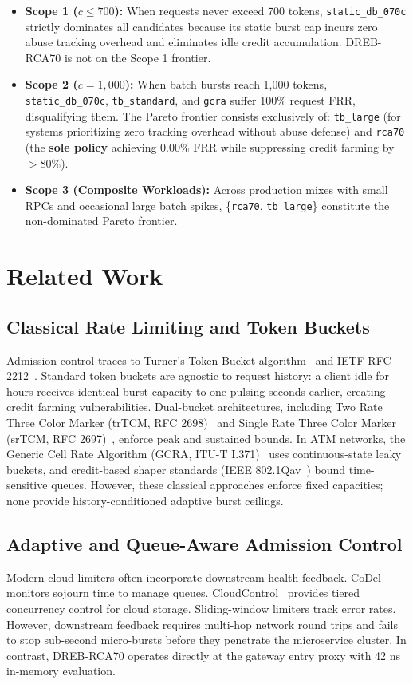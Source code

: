\documentclass[conference]{IEEEtran}
\begin{document}
\begin{itemize}
    \item \textbf{Scope 1 ($c \le 700$):} When requests never exceed 700 tokens, \texttt{static\_db\_070c} strictly dominates all candidates because its static burst cap incurs zero abuse tracking overhead and eliminates idle credit accumulation. DREB-RCA70 is not on the Scope 1 frontier.
    \item \textbf{Scope 2 ($c = 1,000$):} When batch bursts reach 1,000 tokens, \texttt{static\_db\_070c}, \texttt{tb\_standard}, and \texttt{gcra} suffer 100\% request FRR, disqualifying them. The Pareto frontier consists exclusively of: \texttt{tb\_large} (for systems prioritizing zero tracking overhead without abuse defense) and \texttt{rca70} (the \textbf{sole policy} achieving 0.00\% FRR while suppressing credit farming by $>80\%$).
    \item \textbf{Scope 3 (Composite Workloads):} Across production mixes with small RPCs and occasional large batch spikes, \{\texttt{rca70}, \texttt{tb\_large}\} constitute the non-dominated Pareto frontier.
\end{itemize}

\section{Related Work}

\subsection{Classical Rate Limiting and Token Buckets}
Admission control traces to Turner's Token Bucket algorithm~\cite{turner1986new} and IETF RFC 2212~\cite{rfc2212}. Standard token buckets are agnostic to request history: a client idle for hours receives identical burst capacity to one pulsing seconds earlier, creating credit farming vulnerabilities. Dual-bucket architectures, including Two Rate Three Color Marker (trTCM, RFC 2698)~\cite{rfc2698} and Single Rate Three Color Marker (srTCM, RFC 2697)~\cite{rfc2697}, enforce peak and sustained bounds. In ATM networks, the Generic Cell Rate Algorithm (GCRA, ITU-T I.371)~\cite{itu1996i371} uses continuous-state leaky buckets, and credit-based shaper standards (IEEE 802.1Qav~\cite{ieee8021qav}) bound time-sensitive queues. However, these classical approaches enforce fixed capacities; none provide history-conditioned adaptive burst ceilings.

\subsection{Adaptive and Queue-Aware Admission Control}
Modern cloud limiters often incorporate downstream health feedback. CoDel~\cite{nichols2012controlling} monitors sojourn time to manage queues. CloudControl~\cite{li2017cloudcontrol} provides tiered concurrency control for cloud storage. Sliding-window limiters track error rates. However, downstream feedback requires multi-hop network round trips and fails to stop sub-second micro-bursts before they penetrate the microservice cluster. In contrast, DREB-RCA70 operates directly at the gateway entry proxy with 42 ns in-memory evaluation.
\end{document}
